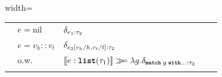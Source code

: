 \begin{table}[t]
\begin{center}
\begin{adjustbox}{width=\textwidth}
\begin{tabular}{l l l l l}
			& $e = \text{nil}$ & $\delta_{e_1 : \tau_2}$ \\
			& $e = v_h :: v_t $ & $\delta_{e_2[v_h/h, v_t/t] : \tau_2}$  \\
			& o.w. & $\llbracket e : \textnormal{\ttfamily\bfseries list}(\tau_1) \rrbracket \gg\!\!= \lambda g.\delta_{\textnormal{\ttfamily\bfseries match} \; g \; \textnormal{\ttfamily\bfseries with} ... : \tau_2}$  \\

			& & \\
			\bottomrule
			\bottomrule
		\end{tabular}
	\end{adjustbox}
	\end{center}%
\end{table}%
